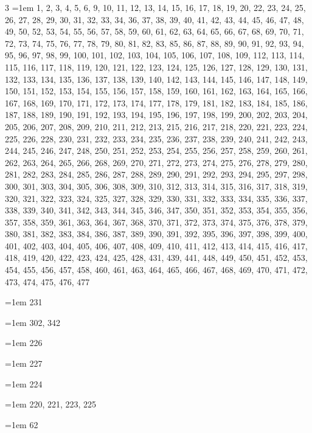 \begin{multicols}{3}
\hangindent=1em  1, 2, 3, 4, 5, 6, 9, 10, 11, 12, 13, 14, 15, 16, 17, 18, 19, 20, 22, 23, 24, 25, 26, 27, 28, 29, 30, 31, 32, 33, 34, 36, 37, 38, 39, 40, 41, 42, 43, 44, 45, 46, 47, 48, 49, 50, 52, 53, 54, 55, 56, 57, 58, 59, 60, 61, 62, 63, 64, 65, 66, 67, 68, 69, 70, 71, 72, 73, 74, 75, 76, 77, 78, 79, 80, 81, 82, 83, 85, 86, 87, 88, 89, 90, 91, 92, 93, 94, 95, 96, 97, 98, 99, 100, 101, 102, 103, 104, 105, 106, 107, 108, 109, 112, 113, 114, 115, 116, 117, 118, 119, 120, 121, 122, 123, 124, 125, 126, 127, 128, 129, 130, 131, 132, 133, 134, 135, 136, 137, 138, 139, 140, 142, 143, 144, 145, 146, 147, 148, 149, 150, 151, 152, 153, 154, 155, 156, 157, 158, 159, 160, 161, 162, 163, 164, 165, 166, 167, 168, 169, 170, 171, 172, 173, 174, 177, 178, 179, 181, 182, 183, 184, 185, 186, 187, 188, 189, 190, 191, 192, 193, 194, 195, 196, 197, 198, 199, 200, 202, 203, 204, 205, 206, 207, 208, 209, 210, 211, 212, 213, 215, 216, 217, 218, 220, 221, 223, 224, 225, 226, 228, 230, 231, 232, 233, 234, 235, 236, 237, 238, 239, 240, 241, 242, 243, 244, 245, 246, 247, 248, 250, 251, 252, 253, 254, 255, 256, 257, 258, 259, 260, 261, 262, 263, 264, 265, 266, 268, 269, 270, 271, 272, 273, 274, 275, 276, 278, 279, 280, 281, 282, 283, 284, 285, 286, 287, 288, 289, 290, 291, 292, 293, 294, 295, 297, 298, 300, 301, 303, 304, 305, 306, 308, 309, 310, 312, 313, 314, 315, 316, 317, 318, 319, 320, 321, 322, 323, 324, 325, 327, 328, 329, 330, 331, 332, 333, 334, 335, 336, 337, 338, 339, 340, 341, 342, 343, 344, 345, 346, 347, 350, 351, 352, 353, 354, 355, 356, 357, 358, 359, 361, 363, 364, 367, 368, 370, 371, 372, 373, 374, 375, 376, 378, 379, 380, 381, 382, 383, 384, 386, 387, 389, 390, 391, 392, 395, 396, 397, 398, 399, 400, 401, 402, 403, 404, 405, 406, 407, 408, 409, 410, 411, 412, 413, 414, 415, 416, 417, 418, 419, 420, 422, 423, 424, 425, 428, 431, 439, 441, 448, 449, 450, 451, 452, 453, 454, 455, 456, 457, 458, 460, 461, 463, 464, 465, 466, 467, 468, 469, 470, 471, 472, 473, 474, 475, 476, 477\par
\hangindent=1em  231\par
\hangindent=1em  302, 342\par
\hangindent=1em  226\par
\hangindent=1em  227\par
\hangindent=1em  224\par
\hangindent=1em  220, 221, 223, 225\par
\hangindent=1em  62\par

\end{multicols}
